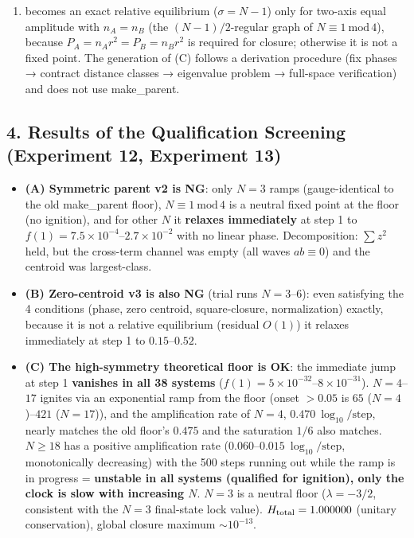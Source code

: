 \documentclass[
  a4paper,
]{ltjsarticle}
\providecommand{\tightlist}{%
  \setlength{\itemsep}{0pt}\setlength{\parskip}{0pt}}
\begin{document}
\begin{enumerate}
\def\labelenumi{(\Alph{enumi})}
\tightlist
\item
  becomes an exact relative equilibrium (\(\sigma=N-1\)) only for
  two-axis equal amplitude with \(n_A=n_B\) (the \((N-1)/2\)-regular
  graph of \(N\equiv1\ \mathrm{mod}\,4\)), because
  \(P_A=n_A r^2=P_B=n_B r^2\) is required for closure; otherwise it is
  not a fixed point. The generation of (C) follows a derivation
  procedure (fix phases → contract distance classes → eigenvalue problem
  → full-space verification) and does not use make\_parent.
\end{enumerate}

\subsection{4. Results of the Qualification Screening (Experiment 12,
Experiment
13)}\label{results-of-the-qualification-screening-experiment-12-experiment-13}

\begin{itemize}
\tightlist
\item
  \textbf{(A) Symmetric parent v2 is NG}: only \(N=3\) ramps
  (gauge-identical to the old make\_parent floor),
  \(N\equiv1\ \mathrm{mod}\,4\) is a neutral fixed point at the floor
  (no ignition), and for other \(N\) it \textbf{relaxes immediately} at
  step 1 to \(f(1)=7.5\times10^{-4}\)--\(2.7\times10^{-2}\) with no
  linear phase. Decomposition: \(\sum z^2\) held, but the cross-term
  channel was empty (all waves \(ab\equiv0\)) and the centroid was
  largest-class.
\item
  \textbf{(B) Zero-centroid v3 is also NG} (trial runs \(N=3\)--\(6\)):
  even satisfying the 4 conditions (phase, zero centroid,
  square-closure, normalization) exactly, because it is not a relative
  equilibrium (residual \(O(1)\)) it relaxes immediately at step 1 to
  \(0.15\)--\(0.52\).
\item
  \textbf{(C) The high-symmetry theoretical floor is OK}: the immediate
  jump at step 1 \textbf{vanishes in all 38 systems}
  (\(f(1)=5\times10^{-32}\)--\(8\times10^{-31}\)). \(N=4\)--\(17\)
  ignites via an exponential ramp from the floor (onset \(>0.05\) is
  \(65\) (\(N=4\))--\(421\) (\(N=17\))), and the amplification rate of
  \(N=4\), \(0.470\ \log_{10}/\text{step}\), nearly matches the old
  floor's \(0.475\) and the saturation \(1/6\) also matches. \(N\ge18\)
  has a positive amplification rate
  (\(0.060\)--\(0.015\ \log_{10}/\text{step}\), monotonically
  decreasing) with the 500 steps running out while the ramp is in
  progress = \textbf{unstable in all systems (qualified for ignition),
  only the clock is slow with increasing \(N\)}. \(N=3\) is a neutral
  floor (\(\lambda=-3/2\), consistent with the \(N=3\) final-state lock
  value). \(H_{\rm total}=1.000000\) (unitary conservation), global
  closure maximum \(\sim10^{-13}\).
\end{itemize}
\end{document}
